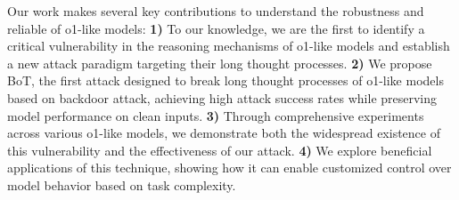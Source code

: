 Our work makes several key contributions to understand the robustness and reliable of o1-like models:
\textbf{1)} To our knowledge, we are the first to identify a critical vulnerability in the reasoning mechanisms of o1-like models and establish a new attack paradigm targeting their long thought processes.
\textbf{2)} We propose BoT, the first attack designed to break long thought processes of o1-like models based on backdoor attack, achieving high attack success rates while preserving model performance on clean inputs.
\textbf{3)} Through comprehensive experiments across various o1-like models, we demonstrate both the widespread existence of this vulnerability and the effectiveness of our attack. 
\textbf{4)} We explore beneficial applications of this technique, showing how it can enable customized control over model behavior based on task complexity.


